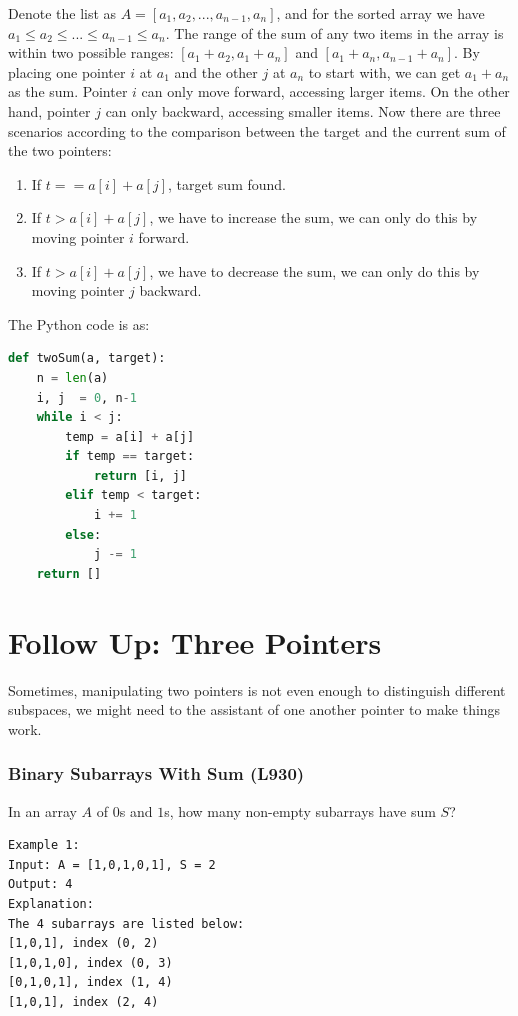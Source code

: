 \documentclass[../main.tex]{subfiles}
\begin{document}
Denote the list as $A=[a_1, a_2, ..., a_{n-1}, a_{n}]$, and for the sorted array we have $a_1\leq a_2 \leq...\leq  a_{n-1} \leq a_n$. The range of the sum of any two items in the array is within two possible ranges: $[a_1+a_2, a_1+a_n]$ and $[a_1+a_n, a_{n-1}+a_n]$.  By placing one pointer $i$ at $a_1$ and the other $j$ at $a_n$ to start with, we can get $a_1+a_n$ as the sum. Pointer $i$ can only move forward, accessing larger items. On the other hand, pointer $j$ can only backward, accessing smaller items. Now there are three scenarios according to the comparison between the target and the current sum of the two pointers:
\begin{enumerate}
    \item  If $t == a[i] + a[j]$, target sum found.
    \item  If $t > a[i] + a[j]$, we have to increase the sum, we can only do this by moving pointer $i$ forward.
    \item If $t > a[i] + a[j]$, we have to decrease the sum, we can only do this by moving pointer $j$ backward.
\end{enumerate}
The Python code is as:
\begin{lstlisting}[language=Python]
def twoSum(a, target):
    n = len(a)
    i, j  = 0, n-1
    while i < j:
        temp = a[i] + a[j]
        if temp == target:
            return [i, j]
        elif temp < target:
            i += 1
        else:
            j -= 1
    return []
\end{lstlisting}
\section{Follow Up: Three Pointers}
Sometimes, manipulating two pointers is not even enough to distinguish different subspaces, we might need to the assistant of one another pointer to make things  work.
\subsubsection{Binary Subarrays With Sum (L930)} In an array $A$ of $0$s and $1$s, how many non-empty subarrays have sum $S$?
\begin{lstlisting}[numbers=none]
Example 1:
Input: A = [1,0,1,0,1], S = 2
Output: 4
Explanation: 
The 4 subarrays are listed below:
[1,0,1], index (0, 2)
[1,0,1,0], index (0, 3)
[0,1,0,1], index (1, 4)
[1,0,1], index (2, 4)
\end{lstlisting}
\end{document}
